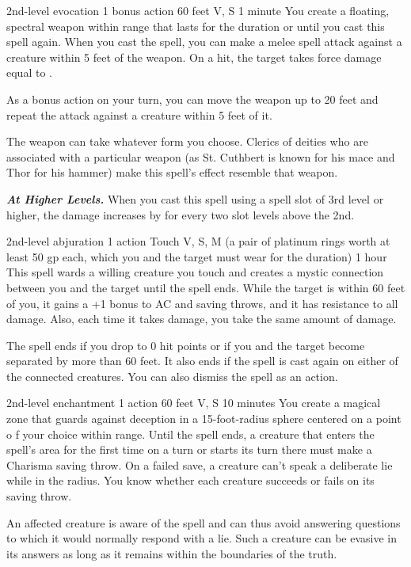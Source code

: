 \documentclass[10pt,twoside,twocolumn,openany]{book}
\newcommand{\castingModifier}{3}
\newcommand\impact[1]{
	\textbf{\textit{#1}}
}
\begin{document}
{2nd-level evocation}
{\color{bonusaction}1 bonus action}
{60 feet}
{V, S}
{1 minute}
%
You create a floating, spectral weapon within range that lasts for the duration or until you cast this spell again. When you cast the spell, you can make a melee spell attack against a creature within 5 feet of the weapon. On a hit, the target takes force damage equal to \dice{1d8 + \castingModifier}.

As a bonus action on your turn, you can move the weapon up to 20 feet and repeat the attack against a creature within 5 feet of it.

The weapon can take whatever form you choose. Clerics of deities who are associated with a particular weapon (as St. Cuthbert is known for his mace and Thor for his hammer) make this spell's effect resemble that weapon.

\impact{At Higher Levels.} When you cast this spell using a spell slot of 3rd level or higher, the damage increases by  for every two slot levels above the 2nd.

{2nd-level abjuration}
{\color{action}1 action}
{Touch}
{V, S, M (a pair of platinum rings worth at least {\color{cost}50 gp} each, which you and the target must wear for the duration)}
{1 hour}
%
This spell wards a willing creature you touch and creates a mystic connection between you and the target until the spell ends. While the target is within 60 feet of you, it gains a +1 bonus to AC and saving throws, and it has resistance to all damage. Also, each time it takes damage, you take the same amount of damage.

The spell ends if you drop to 0 hit points or if you and the target become separated by more than 60 feet. It also ends if the spell is cast again on either of the connected creatures. You can also dismiss the spell as an action.

{2nd-level enchantment}
{\color{action}1 action}
{60 feet}
{V, S}
{10 minutes}
%
You create a magical zone that guards against deception in a 15-foot-radius sphere centered on a point o f your choice within range. Until the spell ends, a creature that enters the spell’s area for the first time on a turn or starts its turn there must make a Charisma saving throw. On a failed save, a creature can’t speak a deliberate lie while in the radius. You know whether each creature succeeds or fails on its saving throw.

An affected creature is aware of the spell and can thus avoid answering questions to which it would normally respond with a lie. Such a creature can be evasive in its answers as long as it remains within the boundaries of the truth.

\newpage
\printindex
\end{document}
